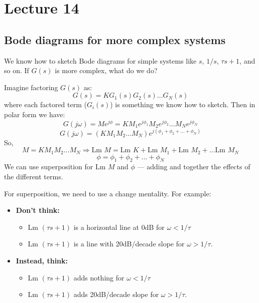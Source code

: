 \documentclass{book}
\newcommand{\jw}{j\omega}
\newcommand{\Lm}{\textrm{Lm }}
\begin{document}
\chapter*{Lecture 14}
\section*{Bode diagrams for more complex systems}
We know how to sketch Bode diagrams for simple systems like $ s $, $ 1/s $, $ \tau s+1 $, and so on. If $ G(s) $ is more complex, what do we do?

Imagine factoring $ G(s) $ as:
\[ G(s) = KG_1(s)G_2(s)\ldots G_N(s) \]
where each factored term ($ G_i(s) $) is something we know how to sketch. Then in polar form we have:
\[ G(\jw) = Me^{j\phi} = K M_1e^{j\phi_1} M_2e^{j\phi_2} \ldots M_Ne^{j\phi_N} \]
\[ G(\jw) = (KM_1M_2\ldots M_N)e^{j(\phi_1+\phi_2+\ldots+\phi_N)} \]
So,
\[ M = KM_1M_2\ldots M_N \Rightarrow \Lm M = \Lm K + \Lm M_1 + \Lm M_2 + \ldots \Lm M_N \]
\[ \phi = \phi_1+\phi_2+\ldots+\phi_N \]
We can use superposition for $ \Lm M $ and $ \phi $ --- adding and together the effects of the different terms.

For superposition, we need to use a change mentality. For example:
\begin{itemize}
	\item \textbf{Don't think:} 
	\begin{itemize}
		\item $ \Lm(\tau s+1) $ is a horizontal line at 0dB for $ \omega < 1/\tau $
		\item $ \Lm(\tau s+1) $ is a line with 20dB/decade slope for $ \omega > 1/\tau $.
	\end{itemize}
	\item \textbf{Instead, think:}
	\begin{itemize}
		\item $ \Lm(\tau s+1) $ adds nothing for $ \omega < 1/\tau $
		\item $ \Lm(\tau s+1) $ adds 20dB/decade slope for $ \omega > 1/\tau $.
	\end{itemize}
\end{itemize}
\clearpage
\end{document}
